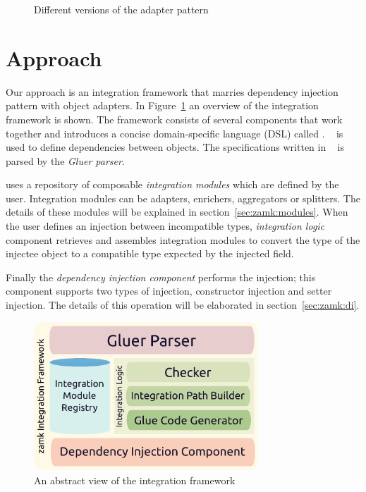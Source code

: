 \documentclass{llncs}
\begin{document}
\begin{figure}[h]
\centering
{}
\hfill
{}
\caption{Different versions of the adapter pattern}
\end{figure}




\section{Approach}
\label{zamk:sec:approach}

Our approach is an integration framework that marries dependency injection pattern with object adapters. In Figure~\ref{fig:main} an overview of the \zamk integration framework is shown. The framework consists of several components that work together and introduces a concise domain-specific language (DSL) called \gluer. \gluer~ is used to define dependencies between objects. The specifications written in \gluer~ is parsed by the \emph{Gluer parser}. 

\zamk uses a repository of composable \emph{integration modules} which are defined by the user. Integration modules can be adapters, enrichers, aggregators or splitters. The details of these modules will be explained in section~\ref{sec:zamk:modules}. When the user defines an injection between incompatible types, \emph{integration logic} component retrieves and assembles integration modules to convert the type of the injectee object to a compatible type expected by the injected field.

Finally the \emph{dependency injection component} performs the injection; this component supports two types of injection, constructor injection and setter injection. The details of this operation will be elaborated in section~\ref{sec:zamk:di}.

\begin{figure}
\centering
\def\svgwidth{\columnwidth}
%
 \includegraphics[width=0.75\textwidth]{../images/zamkoverview2.pdf}
\caption{An abstract view of the \zamk integration framework}
\label{fig:main}
\end{figure}
\end{document}
